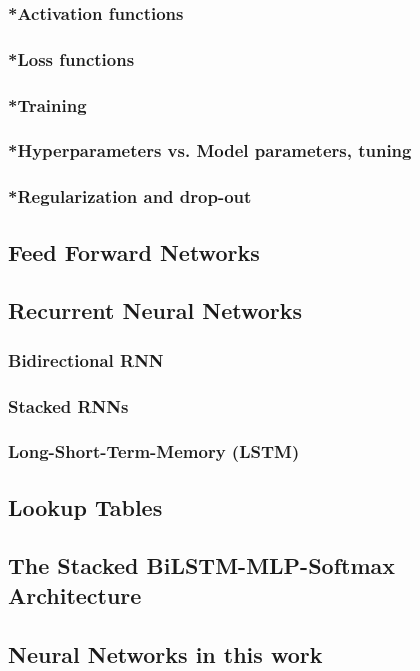 \subsubsection{*Activation functions}
\subsubsection{*Loss functions}
\subsubsection{*Training}
\subsubsection{*Hyperparameters vs. Model parameters, tuning}
\subsubsection{*Regularization and drop-out}
\subsection{Feed Forward Networks}
\subsection{Recurrent Neural Networks}
\subsubsection{Bidirectional RNN}
\subsubsection{Stacked RNNs}
\subsubsection{Long-Short-Term-Memory (LSTM)}
\subsection{Lookup Tables}
\subsection{The Stacked BiLSTM-MLP-Softmax Architecture}
\subsection{Neural Networks in this work}
\pagebreak

